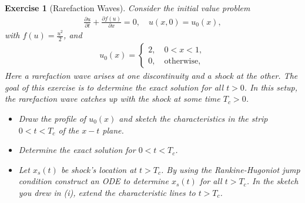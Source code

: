 \documentclass[10pt,letterpaper]{article}
\theoremstyle{break}
\newtheorem{exercise}{Exercise}
\begin{document}
\begin{exercise}[Rarefaction Waves]
    Consider the initial value problem 
    \begin{align}
    	\frac{\partial u}{\partial t}
    	+
    	\frac{\partial f(u)}{\partial x}
    	=0,
    	\quad
    	u(x,0) = u_0(x),
    \end{align}
    with $f(u) =\frac{u^2}{2}$, and
    \begin{align}\label{eq:initial_condition}
    	u_0(x)
    	=
    	\left \{
    	\begin{array}{ll}
    	2, \quad0<x<1, \\
    	0, \quad\text{otherwise},
    	\end{array}
    	\right.
    \end{align}
    Here a rarefaction wave arises at one discontinuity and a shock at the other. 
    The goal of this exercise is to determine the exact solution for all $t>0$. 
    In this setup, the rarefaction wave catches up with the shock at some time $T_c>0$.
    \begin{itemize}
    	\item[(i)]
    	Draw the profile of $u_0(x)$
    	and sketch the characteristics in the strip 
    	$0 < t < T_c$ of the $x-t$ plane.
    	\item[(ii)]
    	Determine the exact solution for $0 < t < T_c$.
    	\item[(iii)]
    	Let $x_s(t)$ be shock's location at $t > T_c$. 
    	By using the Rankine-Hugoniot jump condition construct an ODE to determine 
    	$x_s(t)$ for all $t > T_c$. 
    	In the sketch you drew in (i), extend the characteristic lines to $t > T_c$.
    \end{itemize}
\end{exercise}
\end{document}
